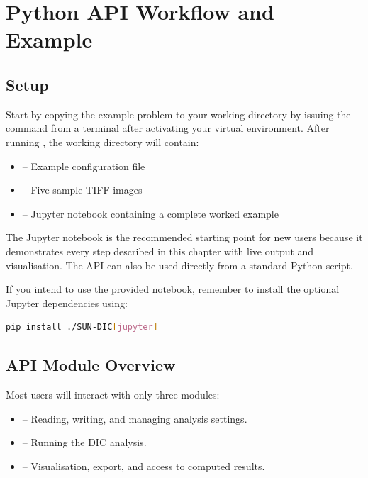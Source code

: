 \chapter{Python API Workflow and Example}
\label{sec:api}

\section{Setup}

Start by copying the example problem to your working directory by issuing the
 command from a terminal after activating your virtual
environment. After running , the working directory will
contain:

\begin{itemize}
	\item {} -- Example configuration file
	\item {} -- Five sample TIFF images
	\item {} -- Jupyter notebook containing a complete worked example
\end{itemize}

The Jupyter notebook is the recommended starting point for new users because it
demonstrates every step described in this chapter with live output and
visualisation. The API can also be used directly from a standard Python
 script.

If you intend to use the provided notebook, remember to install the optional Jupyter
dependencies using:

\begin{lstlisting}[language=bash]
pip install ./SUN-DIC[jupyter]
\end{lstlisting}

\section{API Module Overview}

Most users will interact with only three modules:

\begin{itemize}
	\item {} -- Reading, writing, and managing analysis settings.
	\item {} -- Running the DIC analysis.
	\item {} -- Visualisation, export, and access to computed results.
\end{itemize}

